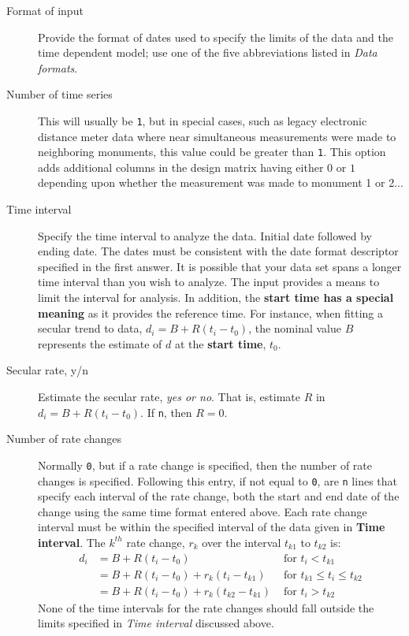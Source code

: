 \documentclass[12pt]{amsart}
\begin{document}
\begin{description}
\item[Format of input]  Provide the format of dates used to specify the limits of the data and the time dependent model; use one of the five abbreviations listed in \textit{Data formats}. 

\item[Number of time series] This will usually be \texttt{1}, but in special cases, such as legacy electronic distance meter
data where near simultaneous measurements were made to neighboring monuments, this value could be greater than \texttt{1}. This option adds additional columns in the design matrix having either $0$ or $1$ depending upon whether
the measurement was made to monument 1 or 2...

\item[Time interval] Specify the time interval to analyze the data. Initial date followed by ending date. The dates must be
consistent with the date format descriptor specified in the first answer. It is possible that your data set spans a longer
time interval than you wish to analyze. The input provides a means to limit the interval for analysis. In addition, the
\textbf{start time has a special meaning} as it provides the reference time.  For instance, when fitting a secular trend to data, $d_i = B + R (t_i -t_{0})$, the nominal value $B$ represents the estimate of $d$ at the \textbf{start time}, $t_{0}$.

\item[Secular rate, y/n]  Estimate the secular rate, \textit{yes or no}.  That is, estimate $R$ in $d_i = B + R (t_i -t_{0})$.
If \texttt{n}, then $R=0$.

\item[Number of rate changes]  Normally \texttt{0}, but if a rate change is specified, then the number of rate changes is specified.  Following this entry, if not equal to \texttt{0}, are \texttt{n} lines that specify each interval of the rate change, both the start and end date of the change using the same time format entered above.  Each rate change interval must be
within the specified interval of the data given in \textbf{Time interval}. The $k^{th}$ rate change, $r_k$ over the interval
$t_{k1}$ to $t_{k2}$ is:
\begin{equation}
\begin{aligned}
d_i & = B + R (t_i - t_0)  & \text{ for } t_i < t_{k1} \\
      & = B + R (t_i - t_0) + r_k (t_i - t_{k1}) & \text{ for } t_{k1} \leq t_i \leq t_{k2} \\
      & = B + R (t_i - t_0) + r_k (t_{k2} - t_{k1}) & \text{ for } t_i >  t_{k2}
\end{aligned}
\end{equation}
None of the time intervals for the rate changes should fall outside the limits specified in \textit{Time interval} discussed above.


\end{description}
\end{document}
